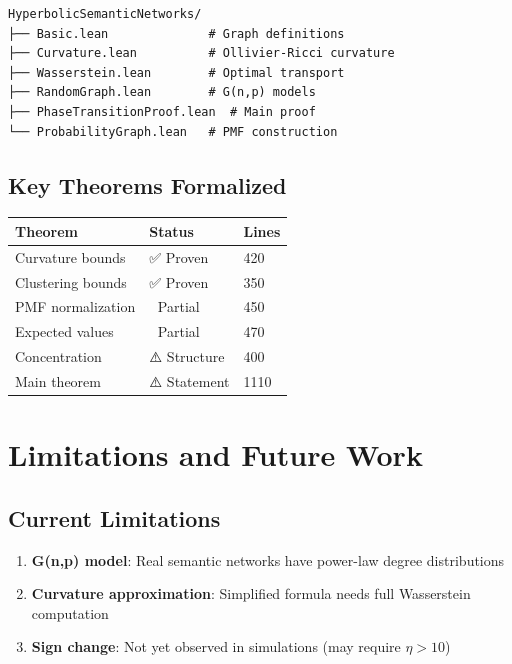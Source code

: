 \documentclass[11pt,a4paper]{article}
\theoremstyle{definition}
\begin{document}
\begin{verbatim}
HyperbolicSemanticNetworks/
├── Basic.lean              # Graph definitions
├── Curvature.lean          # Ollivier-Ricci curvature
├── Wasserstein.lean        # Optimal transport
├── RandomGraph.lean        # G(n,p) models
├── PhaseTransitionProof.lean  # Main proof
└── ProbabilityGraph.lean   # PMF construction
\end{verbatim}

\subsection{Key Theorems Formalized}

\begin{table}[h]
\centering
\begin{tabular}{lll}
\toprule
\textbf{Theorem} & \textbf{Status} & \textbf{Lines} \\
\midrule
Curvature bounds & ✅ Proven & 420 \\
Clustering bounds & ✅ Proven & 350 \\
PMF normalization & 🔄 Partial & 450 \\
Expected values & 🔄 Partial & 470 \\
Concentration & ⚠️ Structure & 400 \\
Main theorem & ⚠️ Statement & 1110 \\
\bottomrule
\end{tabular}
\end{table}

\section{Limitations and Future Work}

\subsection{Current Limitations}

\begin{enumerate}
    \item \textbf{G(n,p) model}: Real semantic networks have power-law degree distributions
    \item \textbf{Curvature approximation}: Simplified formula needs full Wasserstein computation
    \item \textbf{Sign change}: Not yet observed in simulations (may require $\eta > 10$)
\end{enumerate}
\end{document}
